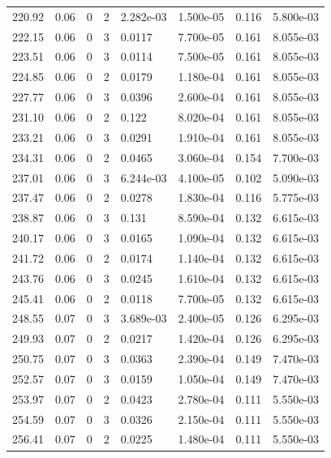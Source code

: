 \documentclass[preview]{standalone}
\begin{document}
{{{{{\begin{tabular}{L{1.2cm}C{1.2cm} C{0.3cm}C{0.5cm} C{1.4cm}C{1.4cm} C{1.4cm}C{1.4cm}}
  220.92  &  0.06  & 0     &  2 &  2.282e-03  & 1.500e-05  & 0.116 &  5.800e-03   \\ 
  222.15  &  0.06  & 0     &  3 &  0.0117  & 7.700e-05  & 0.161 &  8.055e-03   \\ 
  223.51  &  0.06  & 0     &  3 &  0.0114  & 7.500e-05  & 0.161 &  8.055e-03   \\ 
  224.85  &  0.06  & 0     &  2 &  0.0179  & 1.180e-04  & 0.161 &  8.055e-03   \\ 
  227.77  &  0.06  & 0     &  3 &  0.0396  & 2.600e-04  & 0.161 &  8.055e-03   \\ 
  231.10  &  0.06  & 0     &  2 &  0.122  & 8.020e-04  & 0.161 &  8.055e-03   \\ 
  233.21  &  0.06  & 0     &  3 &  0.0291  & 1.910e-04  & 0.161 &  8.055e-03   \\ 
  234.31  &  0.06  & 0     &  2 &  0.0465  & 3.060e-04  & 0.154 &  7.700e-03   \\ 
  237.01  &  0.06  & 0     &  3 &  6.244e-03  & 4.100e-05  & 0.102 &  5.090e-03   \\ 
  237.47  &  0.06  & 0     &  2 &  0.0278  & 1.830e-04  & 0.116 &  5.775e-03   \\ 
  238.87  &  0.06  & 0     &  3 &  0.131  & 8.590e-04  & 0.132 &  6.615e-03   \\ 
  240.17  &  0.06  & 0     &  3 &  0.0165  & 1.090e-04  & 0.132 &  6.615e-03   \\ 
  241.72  &  0.06  & 0     &  2 &  0.0174  & 1.140e-04  & 0.132 &  6.615e-03   \\ 
  243.76  &  0.06  & 0     &  3 &  0.0245  & 1.610e-04  & 0.132 &  6.615e-03   \\ 
  245.41  &  0.06  & 0     &  2 &  0.0118  & 7.700e-05  & 0.132 &  6.615e-03   \\ 
  248.55  &  0.07  & 0     &  3 &  3.689e-03  & 2.400e-05  & 0.126 &  6.295e-03   \\ 
  249.93  &  0.07  & 0     &  2 &  0.0217  & 1.420e-04  & 0.126 &  6.295e-03   \\ 
  250.75  &  0.07  & 0     &  3 &  0.0363  & 2.390e-04  & 0.149 &  7.470e-03   \\ 
  252.57  &  0.07  & 0     &  3 &  0.0159  & 1.050e-04  & 0.149 &  7.470e-03   \\ 
  253.97  &  0.07  & 0     &  2 &  0.0423  & 2.780e-04  & 0.111 &  5.550e-03   \\ 
  254.59  &  0.07  & 0     &  3 &  0.0326  & 2.150e-04  & 0.111 &  5.550e-03   \\ 
  256.41  &  0.07  & 0     &  2 &  0.0225  & 1.480e-04  & 0.111 &  5.550e-03   \\ 

\end{tabular}}}}}}
\end{document}
